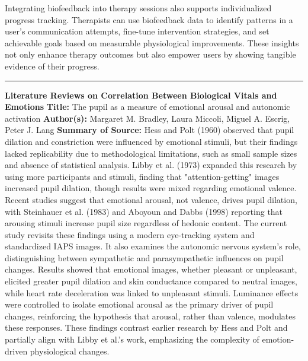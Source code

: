 \documentclass[12pt, research paper]{report}
\begin{document}
	\noindent Integrating biofeedback into therapy sessions also supports individualized progress tracking. Therapists can use biofeedback data to identify patterns in a user’s communication attempts, fine-tune intervention strategies, and set achievable goals based on measurable physiological improvements. These insights not only enhance therapy outcomes but also empower users by showing tangible evidence of their progress.
	
	\noindent \rule{13.85cm}{0.01cm}
	\noindent \textbf{Literature Reviews on Correlation Between Biological Vitals and Emotions}
	\newline \textbf{Title:} The pupil as a measure of emotional arousal and autonomic activation
	\newline \textbf{Author(s):} Margaret M. Bradley, Laura Miccoli, Miguel A. Escrig, Peter J. Lang
	\newline \textbf{Summary of Source:} Hess and Polt (1960) observed that pupil dilation and constriction were influenced by emotional stimuli, but their findings lacked replicability due to methodological limitations, such as small sample sizes and absence of statistical analysis. Libby et al. (1973) expanded this research by using more participants and stimuli, finding that "attention-getting" images increased pupil dilation, though results were mixed regarding emotional valence. Recent studies suggest that emotional arousal, not valence, drives pupil dilation, with Steinhauer et al. (1983) and Aboyoun and Dabbs (1998) reporting that arousing stimuli increase pupil size regardless of hedonic content.
	The current study revisits these findings using a modern eye-tracking system and standardized IAPS images. It also examines the autonomic nervous system's role, distinguishing between sympathetic and parasympathetic influences on pupil changes. Results showed that emotional images, whether pleasant or unpleasant, elicited greater pupil dilation and skin conductance compared to neutral images, while heart rate deceleration was linked to unpleasant stimuli. Luminance effects were controlled to isolate emotional arousal as the primary driver of pupil changes, reinforcing the hypothesis that arousal, rather than valence, modulates these responses. These findings contrast earlier research by Hess and Polt and partially align with Libby et al.'s work, emphasizing the complexity of emotion-driven physiological changes.
\end{document}
